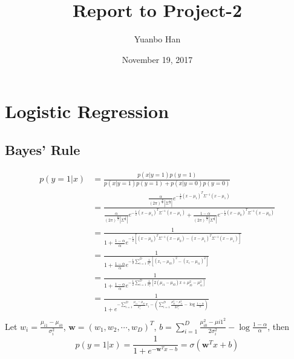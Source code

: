 \documentclass{article}
\title{Report to Project-2}
\author{Yuanbo Han\quad15300180032}
\date{November 19, 2017}
\newcommand \w{\mathbf{w}}
\newcommand \sumi {\sum_{i=1}^}
\begin{document}
\maketitle

\tableofcontents


\section{Logistic Regression}
\subsection{Bayes' Rule}
\begin{align*}
p(y=1|x) &= \frac{p(x|y=1)p(y=1)}{p(x|y=1)p(y=1)+p(x|y=0)p(y=0)} \\
&= \frac{ \frac{\alpha}{(2\pi)^\frac{D}{2} \left| \Sigma^\frac{1}{2} \right|}
e^{-\frac{1}{2} (x-\mu_1)^T \Sigma^{-1} (x-\mu_1)} }
{ \frac{\alpha}{(2\pi)^\frac{D}{2} \left| \Sigma^\frac{1}{2} \right|}
e^{-\frac{1}{2} (x-\mu_1)^T \Sigma^{-1} (x-\mu_1)}
+ \frac{1-\alpha}{(2\pi)^\frac{D}{2} \left| \Sigma^\frac{1}{2} \right|}
e^{-\frac{1}{2} (x-\mu_0)^T \Sigma^{-1} (x-\mu_0)} } \\
&= \frac{1}{1+\frac{1-\alpha}{\alpha}
e^{-\frac{1}{2} \left[ (x-\mu_0)^T \Sigma^{-1}(x-\mu_0) - (x-\mu_1)^T \Sigma^{-1}(x-\mu_1) \right] } } \\
&= \frac{1}{1+\frac{1-\alpha}{\alpha}
e^{-\frac{1}{2} \sumi{D} \frac{1}{\sigma_i^2} \left[ (x_i-\mu_{i0})^2 - (x_i-\mu_{i1})^2 \right] } } \\
&= \frac{1}{1+\frac{1-\alpha}{\alpha}
e^{-\frac{1}{2} \sumi{D} \frac{1}{\sigma_i^2} \left[ 2(\mu_{i1}-\mu_{i0})x + \mu_{i0}^2 - \mu_{i1}^2 \right] } } \\
&= \frac{1}{1 + e^{-\sumi{D} \frac{\mu_{i1}-\mu_{i0}}{\sigma_i^2}x_i
- \left( \sumi{D} \frac{\mu_{i0}^2 - \mu_{i1}^2}{2\sigma_i^2} - \log \frac{1-\alpha}{\alpha} \right) } } \\
\end{align*}
Let $w_i = \frac{\mu_{i1}-\mu_{i0}}{\sigma_i^2}$,
$\w = (w_1, w_2, \cdots, w_D)^T$,
$b = \sumi{D} \frac{\mu_{i0}^2-\mu{i1}^2}{2\sigma_i^2} - \log \frac{1-\alpha}{\alpha}$,
then
\[
p(y=1|x) = \frac{1}{ 1+e^{-\w^Tx-b} } = \sigma \left( \w^Tx+b \right)
\]
\end{document}
